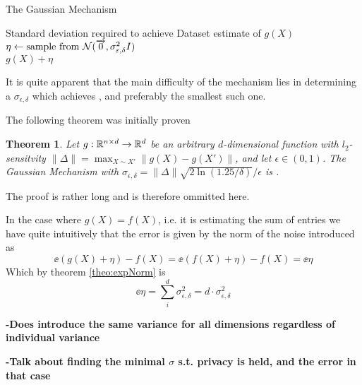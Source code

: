 \documentclass[a4paper,12pt]{article}
\newcommand{\Desc}[2]{\State \makebox[6em][l]{#1}#2}
\newtheorem{theorem}{Theorem}
\begin{document}
\begin{algorithm}
\caption{The Gaussian Mechanism}\label{alg:gaussmech}
\begin{algorithmic}
    \Input
    \Desc{$\sigma_{\epsilon,\delta}$}{Standard deviation required to achieve \edp}
    \Desc{$X \in \R^{n \times d}$}{Dataset}
    \EndInput
    \Output
    \State\edp estimate of $g(X)$
    \EndOutput
    \State$\eta \gets \textnormal{sample from } \mathcal{N}(\overrightarrow{0}, \sigma_{\epsilon,\delta}^2I)$ \\
    \Return$g(X) + \eta$
\end{algorithmic}
\end{algorithm}
It is quite apparent that the main difficulty of the mechanism 
lies in determining a $\sigma_{\epsilon, \delta}$ which achieves
\edp, and preferably the smallest such one.

The following theorem was initially proven
\begin{theorem}\textnormal{\cite{dpbasic}}
\label{theo:gaussMech}
Let $g: \R^{n \times d} \rightarrow \R^{d}$ be an arbitrary 
$d$-dimensional function with $l_2$-sensitvity 
$\| \Delta \| = \max_{X \sim X'} \| g(X) - g(X') \|$, 
and let $\epsilon \in (0,1)$.
The Gaussian Mechanism with
$\sigma_{\epsilon, \delta} = \| \Delta \| \sqrt{2\ln(1.25/\delta)}/\epsilon$ 
is \edp.
\end{theorem}
The proof is rather long and is therefore ommitted here.

In the case where $g(X) = f(X)$, i.e. it is estimating the sum
of entries we have quite intuitively that the error is given by 
the norm of the noise introduced as
\[
    \ee{(g(X) + \eta) - f(X)} =
    \ee{(f(X) + \eta) - f(X)} = 
    \ee{\eta}
\]
Which by theorem \ref{theo:expNorm} is 
\[
    \ee{\eta} = \sum_i^d \sigma_{\epsilon,\delta}^2 = d \cdot \sigma_{\epsilon,\delta}^2
\]


\textbf{-Does introduce the same 
variance for all dimensions regardless of individual variance}

\textbf{-Talk about finding the minimal $\sigma$ s.t. 
privacy is held, and the error in that case}
\end{document}
